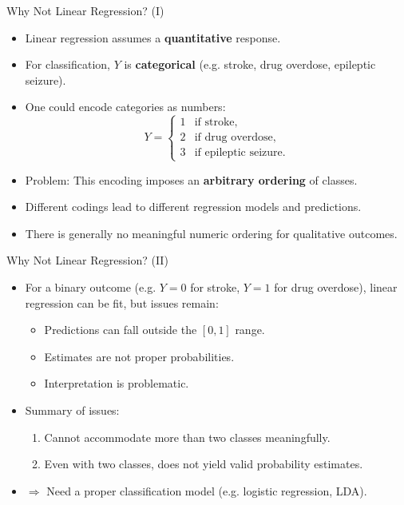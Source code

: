 \documentclass[../../main.tex]{subfiles}
\begin{document}
\begin{frame}{Why Not Linear Regression? (I)}
\begin{itemize}
    \item Linear regression assumes a \textbf{quantitative} response.  
    \item For classification, $Y$ is \textbf{categorical} (e.g. stroke, drug overdose, epileptic seizure).  
    \item One could encode categories as numbers:
    \[
    Y =
    \begin{cases}
    1 & \text{if stroke}, \\
    2 & \text{if drug overdose}, \\
    3 & \text{if epileptic seizure}.
    \end{cases}
    \]
    \item Problem: This encoding imposes an \textbf{arbitrary ordering} of classes.  
    \item Different codings lead to different regression models and predictions.  
    \item There is generally no meaningful numeric ordering for qualitative outcomes.  
\end{itemize}
\end{frame}

\begin{frame}{Why Not Linear Regression? (II)}
\begin{itemize}
    \item For a binary outcome (e.g. $Y=0$ for stroke, $Y=1$ for drug overdose),  
    linear regression can be fit, but issues remain:
    \begin{itemize}
        \item Predictions can fall outside the $[0,1]$ range.  
        \item Estimates are not proper probabilities.  
        \item Interpretation is problematic.  
    \end{itemize}
    \item Summary of issues:
    \begin{enumerate}
        \item Cannot accommodate more than two classes meaningfully.  
        \item Even with two classes, does not yield valid probability estimates.  
    \end{enumerate}
    \item $\Rightarrow$ Need a proper classification model (e.g. logistic regression, LDA).  
\end{itemize}
\end{frame}
\end{document}
